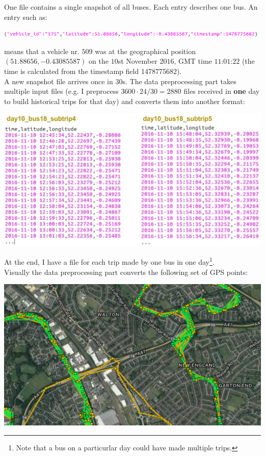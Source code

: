 \documentclass[12pt,a4paper,oneside,openright]{report}
\begin{document}
One file contains a single snapshot of all buses. Each entry describes one bus. An entry such as:

\includegraphics[width=\textwidth]{figs/entry.png}

means that a vehicle nr. $509$ was at the geographical position
$(51.88656, -0.43085587)$ on the $10$st November $2016$, GMT time
$11$:$01$:$22$ (the time is calculated from the timestamp field 1478775682). \\

A new snapshot file arrives once in $30$s. The data preprocessing part
takes multiple input files (e.g. I preprocess $3600 \cdot 24 / 30 = 2880$ files
received in \textbf{one} day to build historical trips for that day) and converts them
into another format:

\includegraphics[width=\textwidth]{figs/converted_format.jpg}

At the end, I have a file for each trip made by one bus in one
day\footnote{Note that a bus on a particurlar day could have made
multiple trips.}. \\

Visually the data preprocessing part converts the following set of GPS points:

\includegraphics[width=\textwidth]{figs/unprocessed.png} \\
\end{document}
